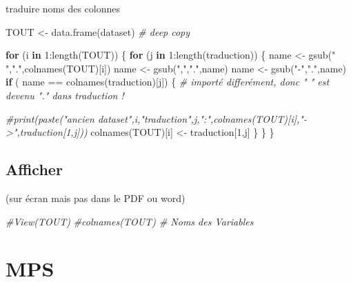 \documentclass[
]{article}
\newenvironment{Shaded}{\begin{snugshade}}{\end{snugshade}}
\newcommand{\CommentTok}[1]{\textcolor[rgb]{0.56,0.35,0.01}{\textit{#1}}}
\newcommand{\ControlFlowTok}[1]{\textcolor[rgb]{0.13,0.29,0.53}{\textbf{#1}}}
\newcommand{\DecValTok}[1]{\textcolor[rgb]{0.00,0.00,0.81}{#1}}
\newcommand{\FunctionTok}[1]{\textcolor[rgb]{0.00,0.00,0.00}{#1}}
\newcommand{\NormalTok}[1]{#1}
\newcommand{\OtherTok}[1]{\textcolor[rgb]{0.56,0.35,0.01}{#1}}
\newcommand{\SpecialCharTok}[1]{\textcolor[rgb]{0.00,0.00,0.00}{#1}}
\newcommand{\StringTok}[1]{\textcolor[rgb]{0.31,0.60,0.02}{#1}}
\begin{document}
traduire noms des colonnes

\begin{Shaded}
\begin{Highlighting}[]
\NormalTok{TOUT }\OtherTok{\textless{}{-}} \FunctionTok{data.frame}\NormalTok{(dataset)  }\CommentTok{\# deep copy}

\ControlFlowTok{for}\NormalTok{ (i }\ControlFlowTok{in} \DecValTok{1}\SpecialCharTok{:}\FunctionTok{length}\NormalTok{(TOUT)) \{}
  \ControlFlowTok{for}\NormalTok{ (j }\ControlFlowTok{in} \DecValTok{1}\SpecialCharTok{:}\FunctionTok{length}\NormalTok{(traduction)) \{}
\NormalTok{    name }\OtherTok{\textless{}{-}} \FunctionTok{gsub}\NormalTok{(}\StringTok{" "}\NormalTok{,}\StringTok{"."}\NormalTok{,}\FunctionTok{colnames}\NormalTok{(TOUT)[i])}
\NormalTok{    name }\OtherTok{\textless{}{-}} \FunctionTok{gsub}\NormalTok{(}\StringTok{","}\NormalTok{,}\StringTok{"."}\NormalTok{,name)}
\NormalTok{    name }\OtherTok{\textless{}{-}} \FunctionTok{gsub}\NormalTok{(}\StringTok{"{-}"}\NormalTok{,}\StringTok{"."}\NormalTok{,name)}
    \ControlFlowTok{if}\NormalTok{ ( name }\SpecialCharTok{==}  \FunctionTok{colnames}\NormalTok{(traduction)[j]) \{}
      \CommentTok{\# importé differément, donc " " est devenu "." dans traduction !}
      
      \CommentTok{\#print(paste("ancien dataset",i,"traduction",j,":",colnames(TOUT)[i],"{-}\textgreater{}",traduction[1,j]))}
      \FunctionTok{colnames}\NormalTok{(TOUT)[i] }\OtherTok{\textless{}{-}}\NormalTok{ traduction[}\DecValTok{1}\NormalTok{,j]}
\NormalTok{    \}}
\NormalTok{  \}}
\NormalTok{\}}
\end{Highlighting}
\end{Shaded}

\hypertarget{afficher}{%
\subsection{Afficher}\label{afficher}}

(sur écran mais pas dans le PDF ou word)

\begin{Shaded}
\begin{Highlighting}[]
\CommentTok{\#View(TOUT)}
\CommentTok{\#colnames(TOUT)   \# Noms des Variables}
\end{Highlighting}
\end{Shaded}

\hypertarget{mps}{%
\section{MPS}\label{mps}}
\end{document}
